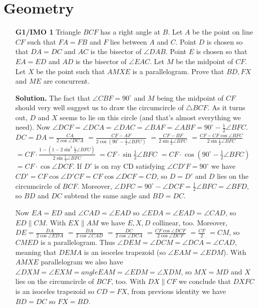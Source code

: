 \documentclass[11pt,a4paper]{article}
\begin{document}
\section{Geometry}
\begin{itemize}
\item[\textbf{G1/IMO 1}]
Triangle $BCF$ has a right angle at $B$. Let $A$ be the point on line $CF$ such that $FA=FB$ and $F$ lies between $A$ and $C$. Point $D$ is chosen so that $DA=DC$ and $AC$ is the bisector of $\angle{DAB}$. Point $E$ is chosen so that $EA=ED$ and $AD$ is the bisector of $\angle{EAC}$. Let $M$ be the midpoint of $CF$. Let $X$ be the point such that $AMXE$ is a parallelogram. Prove that $BD,FX$ and $ME$ are concurrent.

\textbf{Solution.} 
The fact that $\angle CBF=90^{\circ}$ and $M$ being the midpoint of $CF$ should very well suggest us to draw the circumcircle of $\triangle BCF$. 
As it turns out, $D$ and $X$ seems to lie on this circle (and that's almost everything we need). 
Now $\angle DCF=\angle DCA=\angle DAC=\angle BAF=\angle ABF=90^{\circ}-\frac 12\angle BFC$. 
$DC=DA=\frac{CA}{2\cos\angle DCA}$
                            $=\frac{CF-AF}{2\cos(90^{\circ}-\frac 12\angle BFC)}$
                            $=\frac{CF-BF}{2\sin\frac 12\angle BFC}$
                            $=\frac{CF-CF\cos\angle BFC}{2\sin\frac 12\angle BFC}$
                            $=CF\cdot\frac{1-(1-2\sin ^2\frac 12\angle BFC)}{2\sin\frac 12\angle BFC}$
                            $=CF\cdot\sin \frac 12\angle BFC$
                            $=CF\cdot\cos (90^{\circ}-\frac 12\angle BFC)$
                            $=CF\cdot\cos\angle DCF$.
                            If $D'$ is on ray CD satisfying $\angle CD'F=90^{\circ}$ we have $CD'=CF\cos\angle D'CF=CF\cos\angle DCF=CD$, so
                            $D=D'$ and $D$ lies on the circumcircle of $BCF$. 
                            Moreover, $\angle DFC=90^{\circ}-\angle DCF=\frac 12\angle BFC=\angle BFD$, 
                            so $BD$ and $DC$ subtend the same angle and $BD=DC$. 

Now $EA=ED$ and $\angle CAD=\angle EAD$ so $\angle EDA=\angle EAD=\angle CAD$, so $ED\parallel CM$. 
                            With $EX\parallel AM$ we have $E, X, D$ collinear, too. 
                            Moreover, $DE=\frac{DA}{2\cos\angle EDA}$
                            $=\frac{DA}{2\cos\angle CAD}$
                            $=\frac{DC}{2\cos\angle DCA}$
                            $=\frac{CF\cos\angle DCF}{2\cos\angle DCF}$
                            $=\frac{CF}{2}$
                            $=CM$,
                            so $CMED$ is a parallelogram. 
                            Thus $\angle DEM=\angle DCM=\angle DCA=\angle CAD$, meaning that $DEMA$ is an isoceles trapezoid (so $\angle EAM=\angle EDM$). 
                            With $AMXE$ parallelogram we also have $\angle DXM=\angle EXM=angle EAM=\angle EDM=\angle XDM$, so $MX=MD$ and $X$ lies on the circumcircle of $BCF$, too. 
                            With $DX\parallel CF$ we conclude that $DXFC$ is an isoceles trapezoid so $CD=FX$, from previous identity we have $BD=DC$ so $FX=BD$.


\end{itemize}
\end{document}
